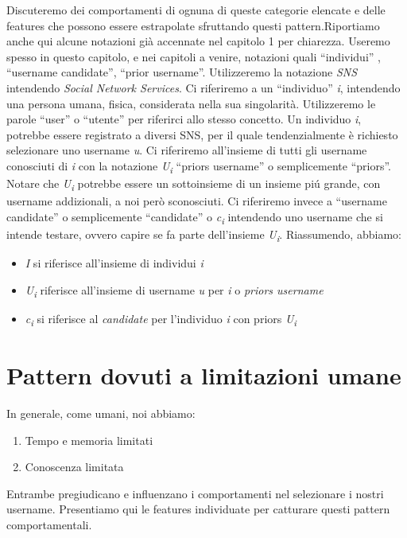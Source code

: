 Discuteremo dei comportamenti di ognuna di queste categorie elencate e delle features che possono essere estrapolate sfruttando questi pattern.\newline Riportiamo anche qui alcune notazioni già accennate nel capitolo 1 per chiarezza. Useremo spesso in questo capitolo, e nei capitoli a venire, notazioni quali “individui” , “username candidate”, “prior username”.
Utilizzeremo la notazione \textit{SNS} intendendo \textit{Social Network Services}.
Ci riferiremo a un “individuo” \textit{i}, intendendo una persona umana, fisica, considerata nella sua singolarità. Utilizzeremo le parole “user” o “utente” per riferirci allo stesso concetto. Un individuo \textit{i}, potrebbe essere registrato a diversi SNS, per il quale tendenzialmente è richiesto selezionare uno username \textit{u}. Ci riferiremo all'insieme di tutti gli username conosciuti di \textit{i} con la notazione \textit{U\textsubscript{i}} “priors username” o semplicemente “priors”. Notare che \textit{U\textsubscript{i}} potrebbe essere un sottoinsieme di un insieme piú grande, con username addizionali, a noi però sconosciuti. Ci riferiremo invece a “username candidate” o semplicemente “candidate” o \textit{c\textsubscript{i}} intendendo uno username che si intende testare, ovvero capire se fa parte dell'insieme \textit{U\textsubscript{i}}.
Riassumendo, abbiamo:
\begin{itemize}
  \item \textit{I} si riferisce all'insieme di individui \textit{i}
  \item \textit{U\textsubscript{i}} riferisce all'insieme di username \textit{u} per \textit{i} o \textit{priors username}
  \item \textit{c\textsubscript{i}} si riferisce al \textit{candidate} per l'individuo \textit{i} con priors \textit{U\textsubscript{i}}
\end{itemize}


\section{Pattern dovuti a limitazioni umane}

In generale, come umani, noi abbiamo:

\begin{enumerate}
  \item Tempo e memoria limitati
  \item Conoscenza limitata
\end{enumerate}

Entrambe pregiudicano e influenzano i comportamenti nel selezionare i nostri username.
Presentiamo qui le features individuate per catturare questi pattern comportamentali.



